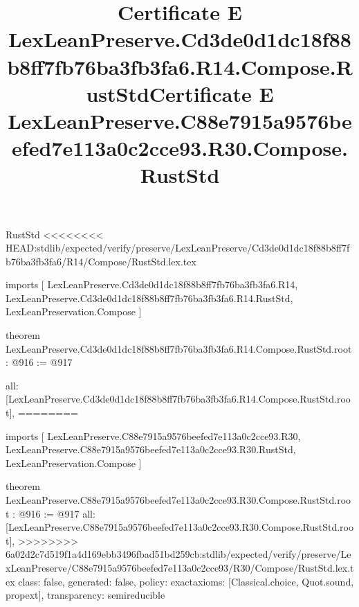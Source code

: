 \begin{lexlean}{RustStd}
<<<<<<<< HEAD:stdlib/expected/verify/preserve/LexLeanPreserve/Cd3de0d1dc18f88b8ff7fb76ba3fb3fa6/R14/Compose/RustStd.lex.tex
\title{Certificate E LexLeanPreserve.Cd3de0d1dc18f88b8ff7fb76ba3fb3fa6.R14.Compose.RustStd}
\begin{coremodule}
imports [
  LexLeanPreserve.Cd3de0d1dc18f88b8ff7fb76ba3fb3fa6.R14,
  LexLeanPreserve.Cd3de0d1dc18f88b8ff7fb76ba3fb3fa6.R14.RustStd,
  LexLeanPreservation.Compose
]

theorem LexLeanPreserve.Cd3de0d1dc18f88b8ff7fb76ba3fb3fa6.R14.Compose.RustStd.root : @916 := @917 {
  all: [LexLeanPreserve.Cd3de0d1dc18f88b8ff7fb76ba3fb3fa6.R14.Compose.RustStd.root],
========
\title{Certificate E LexLeanPreserve.C88e7915a9576beefed7e113a0c2cce93.R30.Compose.RustStd}
\begin{coremodule}
imports [
  LexLeanPreserve.C88e7915a9576beefed7e113a0c2cce93.R30,
  LexLeanPreserve.C88e7915a9576beefed7e113a0c2cce93.R30.RustStd,
  LexLeanPreservation.Compose
]

theorem LexLeanPreserve.C88e7915a9576beefed7e113a0c2cce93.R30.Compose.RustStd.root : @916 := @917 {
  all: [LexLeanPreserve.C88e7915a9576beefed7e113a0c2cce93.R30.Compose.RustStd.root],
>>>>>>>> 6a02d2c7d519f1a4d169ebb3496fbad51bd259cb:stdlib/expected/verify/preserve/LexLeanPreserve/C88e7915a9576beefed7e113a0c2cce93/R30/Compose/RustStd.lex.tex
  class: false,
  generated: false,
  policy: exact{axioms: [Classical.choice, Quot.sound, propext]},
  transparency: semireducible
}


\end{coremodule}}
\end{coremodule}
\end{lexlean}
